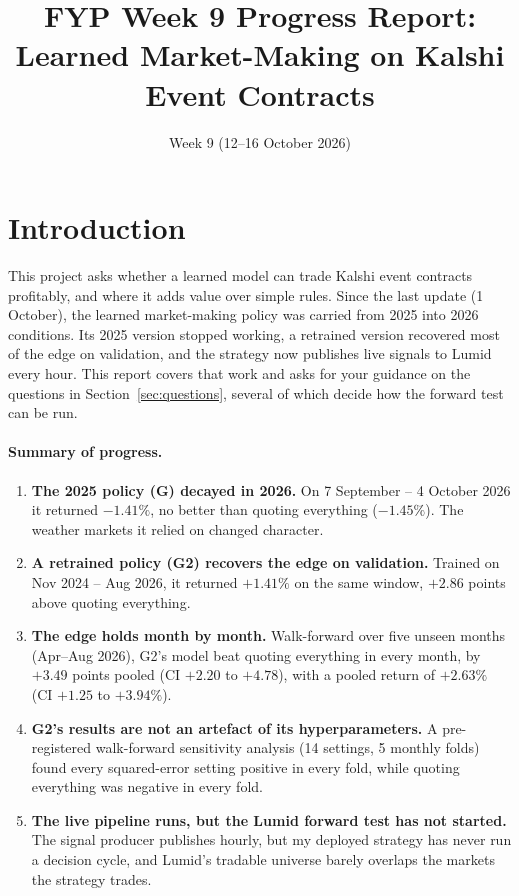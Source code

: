 \documentclass[11pt,a4paper]{article}
\title{FYP Week 9 Progress Report:\\Learned Market-Making on Kalshi Event Contracts}
\date{Week 9 (12--16 October 2026)}
\author{}
\begin{document}
\maketitle
\vspace{-2em}

\section{Introduction}

This project asks whether a learned model can trade Kalshi event contracts profitably, and where it adds value
over simple rules. Since the last update (1 October), the learned market-making policy was carried from 2025 into
2026 conditions. Its 2025 version stopped working, a retrained version recovered most of the edge on validation,
and the strategy now publishes live signals to Lumid every hour. This report covers that work and asks for your
guidance on the questions in Section~\ref{sec:questions}, several of which decide how the forward test can be run.

\paragraph{Summary of progress.}
\begin{enumerate}
  \item \textbf{The 2025 policy (G) decayed in 2026.} On 7 September -- 4 October 2026 it returned $-1.41\%$, no
        better than quoting everything ($-1.45\%$). The weather markets it relied on changed character.
  \item \textbf{A retrained policy (G2) recovers the edge on validation.} Trained on Nov 2024 -- Aug 2026, it
        returned $+1.41\%$ on the same window, $+2.86$ points above quoting everything.
  \item \textbf{The edge holds month by month.} Walk-forward over five unseen months (Apr--Aug 2026), G2's model
        beat quoting everything in every month, by $+3.49$ points pooled (CI $+2.20$ to $+4.78$), with a pooled
        return of $+2.63\%$ (CI $+1.25$ to $+3.94\%$).
  \item \textbf{G2's results are not an artefact of its hyperparameters.} A pre-registered walk-forward sensitivity
        analysis (14 settings, 5 monthly folds) found every squared-error setting positive in every fold, while
        quoting everything was negative in every fold.
  \item \textbf{The live pipeline runs, but the Lumid forward test has not started.} The signal producer publishes
        hourly, but my deployed strategy has never run a decision cycle, and Lumid's tradable universe barely
        overlaps the markets the strategy trades.
\end{enumerate}
\end{document}
